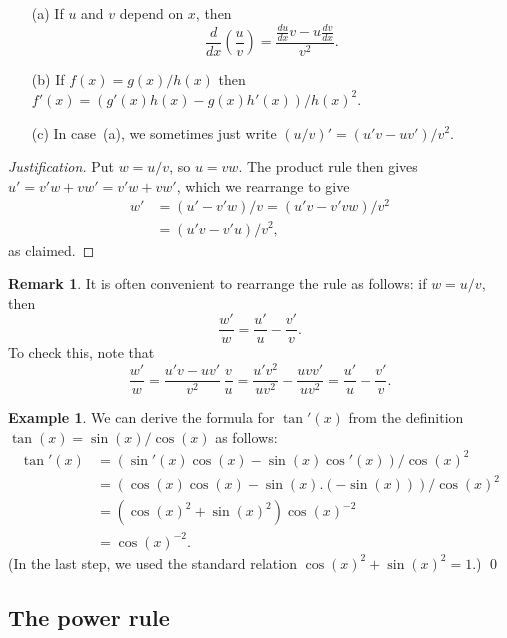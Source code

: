 \documentclass[a4paper]{book}
\theoremstyle{definition}
\newtheorem{remark}[theorem]{Remark}
\newtheorem{example}[theorem]{Example}
\begin{document}
\begin{itemize}
 \item[(a)] If $u$ and $v$ depend on $x$, then
  \[ \frac{d}{dx}\left(\frac{u}{v}\right) = 
     \frac{\tfrac{du}{dx}v-u\tfrac{dv}{dx}}{v^2}.
  \] 
 \item[(b)] If $f(x)=g(x)/h(x)$ then
  $f'(x)=(g'(x)h(x)-g(x)h'(x))/h(x)^2$.
 \item[(c)] In case~(a), we sometimes just write
  $(u/v)'=(u'v-uv')/v^2$.
\end{itemize}
\begin{proof}[Justification]
 Put $w=u/v$, so $u=vw$.  The product rule then gives
 $u'=v'w+vw'=v'w+vw'$, which we rearrange to give
 \begin{align*}
  w' &= (u'-v'w)/v = (u'v-v'vw)/v^2 \\
     &= (u'v-v'u)/v^2,
 \end{align*}
 as claimed.
\end{proof}
\begin{remark}
 It is often convenient to rearrange the rule as follows: if $w=u/v$,
 then 
 \[ \frac{w'}{w} = \frac{u'}{u} - \frac{v'}{v}. \]
 To check this, note that
 \[ \frac{w'}{w} = \frac{u'v-uv'}{v^2}\,\frac{v}{u} 
     = \frac{u'v^2}{uv^2} - \frac{uvv'}{uv^2} 
     = \frac{u'}{u} - \frac{v'}{v}.
 \]  
\end{remark}
\begin{example}
 We can derive the formula for $\tan'(x)$ from the definition
 $\tan(x)=\sin(x)/\cos(x)$ as follows:
 \begin{align*}
  \tan'(x) &= (\sin'(x)\cos(x) - \sin(x)\cos'(x))/\cos(x)^2 \\
           &= (\cos(x)\cos(x) - \sin(x).(-\sin(x)))/\cos(x)^2 \\
           &= (\cos(x)^2 + \sin(x)^2) \cos(x)^{-2} \\
           &= \cos(x)^{-2}.
 \end{align*}
 (In the last step, we used the standard relation
 $\cos(x)^2+\sin(x)^2=1$.) \qed
\end{example}

\subsection{The power rule}
\label{subsec-rule-pow}
\end{document}
